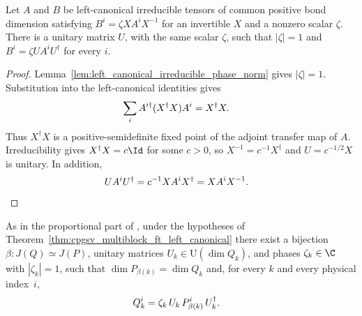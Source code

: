 \begin{lemma}
    \label{lem:left_canonical_irreducible_same_phase_unitary_gauge}
    \leanok
    Let $A$ and $B$ be left-canonical irreducible tensors of common positive
    bond dimension satisfying $B^i=\zeta XA^iX^{-1}$ for an invertible $X$ and
    a nonzero scalar $\zeta$. There is a unitary matrix $U$, with the same scalar
    $\zeta$, such that $|\zeta|=1$ and $B^i=\zeta UA^iU^\dagger$ for every $i$.
\end{lemma}

\begin{proof}\leanok
    Lemma~\ref{lem:left_canonical_irreducible_phase_norm} gives
    $|\zeta|=1$. Substitution into the left-canonical identities gives
    \begin{align}
        \sum_i A^{i\dagger}(X^\dagger X)A^i & =X^\dagger X. \notag
    \end{align}
    Thus $X^\dagger X$ is a positive-semidefinite fixed point of the adjoint
    transfer map of $A$. Irreducibility gives $X^\dagger X=c\Id$ for some
    $c>0$, so $X^{-1}=c^{-1}X^\dagger$ and $U=c^{-1/2}X$ is unitary. In addition,
    \begin{align}
        UA^iU^\dagger
         & =c^{-1}XA^iX^\dagger
        =XA^iX^{-1}. \notag
    \end{align}
\end{proof}

\begin{corollary}%
    \label{cor:sector_bnt_proportional_unitary_sector_match}
    \leanok
    As in the proportional part of
    \cite[Corollary~A.6, lines~1197--1199]{Cirac2016MPDO_arXiv}, under the
    hypotheses of Theorem~\ref{thm:cpgsv_multiblock_ft_left_canonical} there exist a
    bijection $\beta:J(Q)\simeq J(P)$, unitary matrices
    $U_k\in\mathrm{U}(\dim Q_k)$, and phases $\zeta_k\in\C$ with
    $|\zeta_k|=1$, such that $\dim P_{\beta(k)}=\dim Q_k$ and, for every $k$
    and every physical index~$i$,
    \begin{align}
        Q_k^i
         & =\zeta_k\,U_k\,P_{\beta(k)}^i\,U_k^\dagger. \notag
    \end{align}
\end{corollary}

